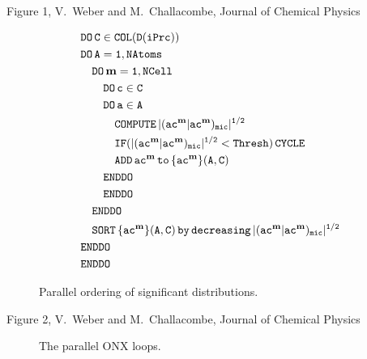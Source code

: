\documentclass[prl,preprint,doublespace]{revtex4} %
\begin{document}
{\clearpage
Figure 1, V.~Weber and M.~Challacombe, Journal of Chemical Physics \\[1.cm]
\begin{figure}[h]
  \caption{\protect
    Parallel ordering of significant distributions.
  }\label{Fig:List}
\begin{center}
  \begin{equation*}
    \begin{split}
      &\tt          DO\,C\in COL(D(iPrc))\\
      &\tt          DO\,A=1,NAtoms\\
      &\tt\quad       DO\,\mathbf{m}=1,NCell\\
      &\tt\qquad        DO\,c\in C\\
      &\tt\qquad        DO\,a\in A\\
      &\tt\qquad\quad     COMPUTE\,|(ac^\mathbf{m}|ac^\mathbf{m})_{mic}|^{1/2}\\
      &\tt\qquad\quad     IF(|(ac^\mathbf{m}|ac^\mathbf{m})_{mic}|^{1/2}<{\tt Thresh)\,CYCLE}\\
      &\tt\qquad\quad     ADD\,ac^\mathbf{m}\,{\tt to}\, \{ac^\mathbf{m}\}(A,C)\\
      &\tt\qquad        ENDDO\\
      &\tt\qquad        ENDDO\\
      &\tt\quad       ENDDO\\
      &\tt\quad       SORT\,\{ac^\mathbf{m}\}(A,C)\,by\,decreasing\,|(ac^\mathbf{m}|ac^\mathbf{m})_{mic}|^{1/2}\\
      &\tt         ENDDO\\
      &\tt         ENDDO
    \end{split}
  \end{equation*}
\end{center}

\end{figure}

\clearpage
Figure 2, V.~Weber  and M.~Challacombe, Journal of Chemical Physics \\[1. cm]
\begin{figure}[h]
  \caption{\protect
    The parallel ONX loops.
  }\label{Fig:ONXcore}
\begin{center}


\end{center}
\end{figure}}
\end{document}
